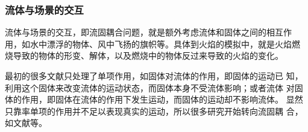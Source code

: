 \subsubsection{流体与场景的交互}
流体与场景的交互，即流固耦合问题，就是额外考虑流体和固体之间的相互作
用，如水中漂浮的物体、风中飞扬的旗帜等。具体到火焰的模拟中，就是火焰燃
烧导致的物体的形变、解体，以及燃烧中的物体反过来导致的火焰的变化。

最初的很多文献只处理了单项作用，如固体对流体的作用，即固体的运动已
知，利用这个固体来改变流体的运动状态，而固体本身不受流体影响；或者流体
对固体的作用，即固体在流体的作用下发生运动，而固体的运动却不影响流体。
显然只靠率单项的作用并不足以表现真实的运动，所以很多研究开始转向流固耦
合，如文献\cite{burning_objects03}\cite{burning_objects05}等。